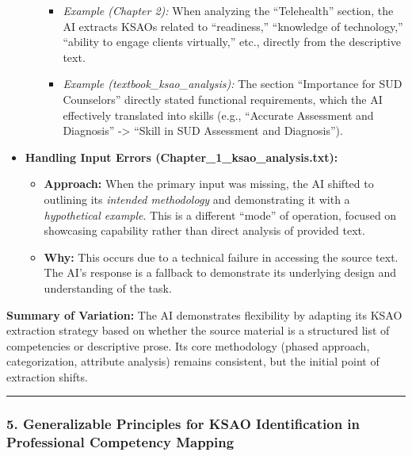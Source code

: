 \documentclass[
  letterpaper,
  DIV=11,
  numbers=noendperiod]{scrartcl}
\providecommand{\tightlist}{%
  \setlength{\itemsep}{0pt}\setlength{\parskip}{0pt}}
\begin{document}
\begin{itemize}
\begin{itemize}
    \begin{itemize}
    \tightlist
    \item
      \emph{Example (Chapter 2):} When analyzing the ``Telehealth''
      section, the AI extracts KSAOs related to ``readiness,''
      ``knowledge of technology,'' ``ability to engage clients
      virtually,'' etc., directly from the descriptive text.
    \item
      \emph{Example (textbook\_ksao\_analysis):} The section
      ``Importance for SUD Counselors'' directly stated functional
      requirements, which the AI effectively translated into skills
      (e.g., ``Accurate Assessment and Diagnosis'' -\textgreater{}
      ``Skill in SUD Assessment and Diagnosis'').
    \end{itemize}
  \end{itemize}
\item
  \textbf{Handling Input Errors (Chapter\_1\_ksao\_analysis.txt):}

  \begin{itemize}
  \tightlist
  \item
    \textbf{Approach:} When the primary input was missing, the AI
    shifted to outlining its \emph{intended methodology} and
    demonstrating it with a \emph{hypothetical example}. This is a
    different ``mode'' of operation, focused on showcasing capability
    rather than direct analysis of provided text.
  \item
    \textbf{Why:} This occurs due to a technical failure in accessing
    the source text. The AI's response is a fallback to demonstrate its
    underlying design and understanding of the task.
  \end{itemize}
\end{itemize}

\textbf{Summary of Variation:} The AI demonstrates flexibility by
adapting its KSAO extraction strategy based on whether the source
material is a structured list of competencies or descriptive prose. Its
core methodology (phased approach, categorization, attribute analysis)
remains consistent, but the initial point of extraction shifts.

\begin{center}\rule{0.5\linewidth}{0.5pt}\end{center}

\subsubsection{5. Generalizable Principles for KSAO Identification in
Professional Competency
Mapping}\label{generalizable-principles-for-ksao-identification-in-professional-competency-mapping}
\end{document}
